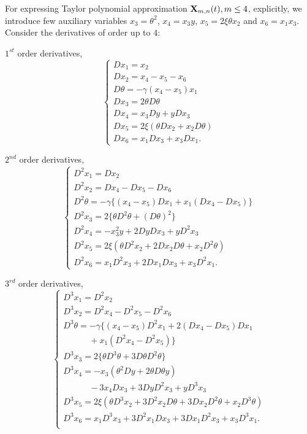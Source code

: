 \documentclass{UCF_ETD}
\begin{document}
\indent For expressing Taylor polynomial approximation  ${\bf X}_{m, n}(t),  m\le 4$,
explicitly, we
introduce few %
auxiliary variables   $x_3 = {\theta}^2$, $x_4 = x_3 y$, $x_5 = 2\xi \theta x_2$ and $x_6 = x_1 x_3$.
Consider the derivatives of order up to $4$:

\indent $1^{st}$ order derivatives,
\begin{equation}\label{firstderivative}
\left\{\begin{array}{l}
D x_1  =  x_2  \\
 D x_2  =  x_4 -x_5 - x_6 \\
 D \theta  = -\gamma (x_4- x_5) x_1  \\
 D x_3  =  2 \theta D\theta \\
D x_4 =  x_3 D y +  y D x_3\\
 D x_5  =  2 \xi (\theta D x_2 + x_2 D \theta )  \\
 D x_6 = x_1 D x_3 + x_3 Dx_1.
 \end{array}
 \right.
\end{equation}

\indent $2^{nd}$ order derivatives,
\begin{equation}\label{secondderivative}
\left\{\begin{array}{l}
 D^2 x_1 = D x_2  \\
 D^2 x_2 = D x_4 -D x_5 - D x_6   \\
 D^2 \theta = -\gamma \{ (x_4- x_5)D x_1 + x_1 (D x_4- D x_5) \} \\
 D^2 x_3 = 2 \{ \theta D^2\theta  +  (D \theta)^2 \}\\
 D^2 x_4 = -x_3^2 y + 2 D y D x_3 + y D^2 x_3   \\
 D^2 x_5 = 2 \xi (\theta D^2 x_2 + 2 D x_2 D \theta  + x_2 D^2 \theta)  \\
 D^2 x_6 = x_1 D^2 x_3 + 2 D x_1 D x_3 +  x_3 D ^2 x_1.
\end{array}\right.\end{equation}

\indent $3^{rd}$ order derivatives,
\begin{equation}\label{thirdderivative}
\left\{\begin{array}{l}
 D^3 x_1 = D^2 x_2 \\
 D^3 x_2 = D^2 x_4 -D^2 x_5 - D^2 x_6   \\
 D^3 \theta = -\gamma  \{ (x_4- x_5)D^2 x_1 + 2(Dx_4- Dx_5)D x_1   \\
\qquad\quad +x_1 (D^2 x_4- D^2 x_5) \}  \\
 D^3 x_3 = 2 \{ \theta D^3\theta  +  3 D \theta D^2 \theta \}  \\
 D^3 x_4 = -x_3({\theta}^2Dy+2{\theta}D{\theta}y)  \\
\qquad \quad - 3x_4Dx_3 + 3 D y D^2 x_3 + y D^3 x_3   \\
 D^3 x_5 = 2 \xi (\theta D^3 x_2 + 3 D^2 x_2 D \theta  + 3 D x_2 D^2 \theta  + x_2 D^3 \theta) \\
 D^3 x_6 = x_1 D^3 x_3 + 3 D^2 x_1 D x_3 + 3 D x_1 D^2 x_3 +  x_3 D ^3 x_1.  \\
\end{array}\right.\end{equation}
\end{document}
